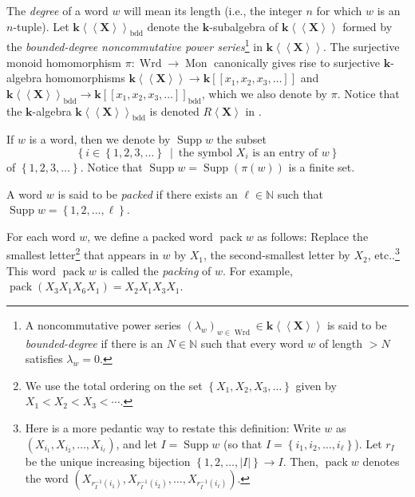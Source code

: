 \documentclass[numbers=enddot,12pt,final,onecolumn,notitlepage,abstracton]{scrartcl}%
\theoremstyle{definition}
\begin{document}
The \textit{degree} of a word $w$ will mean its length (i.e., the integer $n$
for which $w$ is an $n$-tuple). Let $\mathbf{k}\left\langle \left\langle
\mathbf{X}\right\rangle \right\rangle _{\operatorname*{bdd}}$ denote the
$\mathbf{k}$-subalgebra of $\mathbf{k}\left\langle \left\langle \mathbf{X}%
\right\rangle \right\rangle $ formed by the \textit{bounded-degree
noncommutative power series}\footnote{A noncommutative power series $\left(
\lambda_{w}\right)  _{w\in\operatorname*{Wrd}}\in\mathbf{k}\left\langle
\left\langle \mathbf{X}\right\rangle \right\rangle $ is said to be
\textit{bounded-degree} if there is an $N\in\mathbb{N}$ such that every word
$w$ of length $>N$ satisfies $\lambda_{w}=0$.} in $\mathbf{k}\left\langle
\left\langle \mathbf{X}\right\rangle \right\rangle $. The surjective monoid
homomorphism $\pi:\operatorname*{Wrd}\rightarrow\operatorname*{Mon}$
canonically gives rise to surjective $\mathbf{k}$-algebra homomorphisms
$\mathbf{k}\left\langle \left\langle \mathbf{X}\right\rangle \right\rangle
\rightarrow\mathbf{k}\left[  \left[  x_{1},x_{2},x_{3},\ldots\right]  \right]
$ and $\mathbf{k}\left\langle \left\langle \mathbf{X}\right\rangle
\right\rangle _{\operatorname*{bdd}}\rightarrow\mathbf{k}\left[  \left[
x_{1},x_{2},x_{3},\ldots\right]  \right]  _{\operatorname*{bdd}}$, which we
also denote by $\pi$. Notice that the $\mathbf{k}$-algebra $\mathbf{k}%
\left\langle \left\langle \mathbf{X}\right\rangle \right\rangle
_{\operatorname*{bdd}}$ is denoted $R\left\langle \mathbf{X}\right\rangle $ in
\cite[Section 8.1]{Reiner}.

If $w$ is a word, then we denote by $\operatorname*{Supp}w$ the subset%
\[
\left\{  i\in\left\{  1,2,3,\ldots\right\}  \ \mid\ \text{the symbol }%
X_{i}\text{ is an entry of }w\right\}
\]
of $\left\{  1,2,3,\ldots\right\}  $. Notice that $\operatorname*{Supp}%
w=\operatorname*{Supp}\left(  \pi\left(  w\right)  \right)  $ is a finite set.

A word $w$ is said to be \textit{packed} if there exists an $\ell\in
\mathbb{N}$ such that $\operatorname*{Supp}w=\left\{  1,2,\ldots,\ell\right\}
$.

For each word $w$, we define a packed word $\operatorname*{pack}w$ as follows:
Replace the smallest letter\footnote{We use the total ordering on the set
$\left\{  X_{1},X_{2},X_{3},\ldots\right\}  $ given by $X_{1}<X_{2}%
<X_{3}<\cdots$.} that appears in $w$ by $X_{1}$, the second-smallest letter by
$X_{2}$, etc..\footnote{Here is a more pedantic way to restate this
definition: Write $w$ as $\left(  X_{i_{1}},X_{i_{2}},\ldots,X_{i_{\ell}%
}\right)  $, and let $I=\operatorname*{Supp}w$ (so that $I=\left\{
i_{1},i_{2},\ldots,i_{\ell}\right\}  $). Let $r_{I}$ be the unique increasing
bijection $\left\{  1,2,\ldots,\left\vert I\right\vert \right\}  \rightarrow
I$. Then, $\operatorname*{pack}w$ denotes the word $\left(  X_{r_{I}%
^{-1}\left(  i_{1}\right)  },X_{r_{I}^{-1}\left(  i_{2}\right)  }%
,\ldots,X_{r_{I}^{-1}\left(  i_{\ell}\right)  }\right)  $.} This word
$\operatorname*{pack}w$ is called the \textit{packing} of $w$. For example,
$\operatorname*{pack}\left(  X_{3}X_{1}X_{6}X_{1}\right)  =X_{2}X_{1}%
X_{3}X_{1}$.
\end{document}
